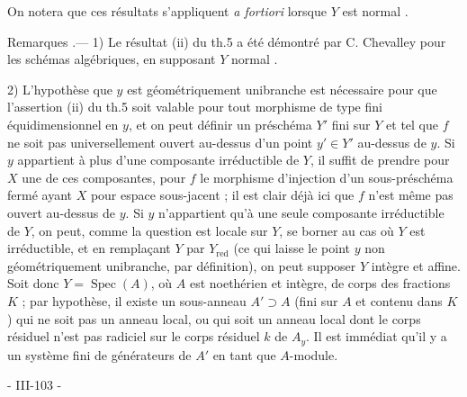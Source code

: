 On notera que ces résultats s'appliquent \emph{a fortiori} lorsque $Y$ est normal .

Remarques .— 1) Le résultat (ii) du th.5 a été démontré par C. Chevalley pour les schémas algébriques, en supposant $Y$ normal .

2) L'hypothèse que $y$ est géométriquement unibranche est nécessaire pour que l'assertion (ii) du th.5 soit valable pour tout morphisme de type fini équidimensionnel en $y$, et on peut définir un préschéma $Y'$ fini sur $Y$ et tel que $f$ ne soit pas universellement ouvert au-dessus d'un point $y' \in Y'$ au-dessus de $y$. Si $y$ appartient à plus d'une composante irréductible de $Y$, il suffit de prendre pour $X$ une de ces composantes, pour $f$ le morphisme d'injection d'un sous-préschéma fermé ayant $X$ pour espace sous-jacent ; il est clair déjà ici que $f$ n'est même pas ouvert au-dessus de $y$. Si $y$ n'appartient qu'à une seule composante irréductible de $Y$, on peut, comme la question est locale sur $Y$, se borner au cas où $Y$ est irréductible, et en remplaçant $Y$ par $Y_{\text{red}}$ (ce qui laisse le point $y$ non géométriquement unibranche, par définition), on peut supposer $Y$ intègre et affine. Soit donc $Y = \operatorname{Spec}(A)$, où $A$ est noethérien et intègre, de corps des fractions $K$ ; par hypothèse, il existe un sous-anneau $A' \supset A$ (fini sur $A$ et contenu dans $K$) qui ne soit pas un anneau local, ou qui soit un anneau local dont le corps résiduel n'est pas radiciel sur le corps résiduel $k$ de $A_y$. Il est immédiat qu'il y a un système fini de générateurs de $A'$ en tant que $A$-module.

\newpage


- III-103 -


